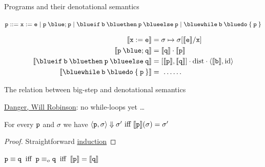 \documentclass{beamer}
\begin{document}
\begin{frame}{Programs and their denotational semantics}
        \begin{block}{\vspace*{-3.5ex}}
        \begin{center}
        $\prog{p} ::= \mathtt{x} := \mathtt{e} \mid
	\mathtt{p \> {\blue ;} \> p} \mid
	\mathtt{{\blue if} \> b \> {\blue then} \> p \> {\blue else} \> p} \mid
	\mathtt{{\blue while} \> b \> {\blue do} \> \{ \> p \> \}}$
\end{center}
	\end{block}

        \begin{align*}
                \sem{\prog{x : = e}} & = \sigma \mapsto \sigma[\sem{\prog{e}}/\prog{x}] \\
                \sem{\prog{p} \> {\blue ;} \> \prog{q}} & 
                = \sem{\prog{q}} \comp \sem{\prog{p}} \\
                \sem{\mathtt{{\blue if} \> b \> {\blue then} \> p \> {\blue else} \> q}}
                                                        & 
                                                        = [\sem{\prog{p}},\sem{\prog{q}}] \comp
                                                        \mathrm{dist} \comp \pv{\sem{\prog{b}}}{\id}
                \\
                \sem{\mathtt{{\blue while} \> b \> {\blue do} \> \{ \> p \> \}} }
                                                        & =\  \dots \dots
        \end{align*}
\end{frame}

\begin{frame}{The relation between big-step and denotational semantics}

        \alert{\underline{Danger, Will Robinson}}: no while-loops yet \dots

        \vfill
        \begin{theorem}
                For every $\mathtt{p}$ and $\sigma$ we
                have 
                $\langle \mathtt{p}, \sigma \rangle \Downarrow \sigma' \text{ iff }
                \llbracket \mathtt{p} \rrbracket(\sigma) = \sigma'$
        \end{theorem}

        \begin{proof}
                Straightforward \alert{\underline{induction}}
        \end{proof}

        \bigskip
        \bigskip
        \begin{corollary}
                $\mathtt{p} \equiv \mathtt{q} \> \text{ iff } \>
                \mathtt{p} \equiv_o \mathtt{q} \> \text{ iff } \>
                \llbracket \mathtt{p} \rrbracket = \llbracket \mathtt{q} \rrbracket$
        \end{corollary}
\end{frame}
\end{document}
